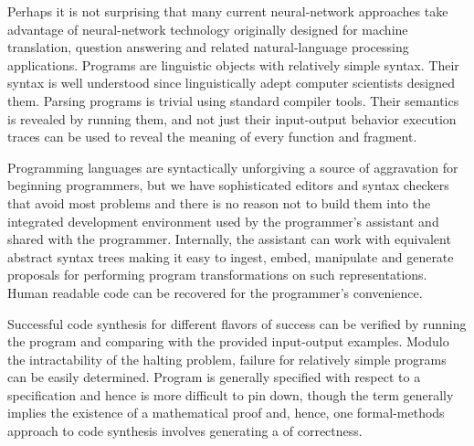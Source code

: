 
Perhaps it is not surprising that many current neural-network approaches take advantage of neural-network technology originally designed for machine translation, question answering and related natural-language processing applications. Programs are linguistic objects with relatively simple syntax. Their syntax is well understood since linguistically adept computer scientists designed them. Parsing programs is trivial using standard compiler tools. Their semantics is revealed by running them, and not just their input-output behavior \emdash{} execution traces can be used to reveal the meaning of every function and fragment. 

Programming languages are syntactically unforgiving \emdash{} a source of aggravation for beginning programmers, but we have sophisticated editors and syntax checkers that avoid most problems and there is no reason not to build them into the integrated development environment used by the programmer's assistant and shared with the programmer. Internally, the assistant can work with equivalent abstract syntax trees making it easy to ingest, embed, manipulate and generate proposals for performing program transformations on such representations. Human readable code can be recovered for the programmer's convenience.

Successful code synthesis \emdash{} for different flavors of success \emdash{} can be verified by running the program and comparing with the provided input-output examples. Modulo the intractability of the halting problem, failure for relatively simple programs can be easily determined. Program {} is generally specified with respect to a specification and hence is more difficult to pin down, though the term generally implies the existence of a mathematical proof and, hence, one formal-methods approach to code synthesis involves generating a {} of correctness. 

